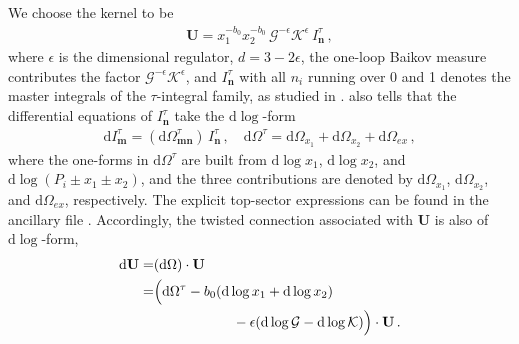 \documentclass[%
 reprint,
 amsmath,amssymb,
 aps,
prd,
]{revtex4-2}
\def\ie{\begin{equation}\begin{aligned}}
\def\fe{\end{aligned}\end{equation}}
\def\di{{\mathrm{d}}}
\def\ii{\mathrm{i}}
\def\ep{\epsilon}
\newcommand{\mG}{\mathcal{G}}
\newcommand{\mK}{\mathcal{K}}
\newcommand{\zq}[1]{{\color[rgb]{.1,.6,.3}{[{ZQ:} #1]}}}
\newcommand{\cjq}[1]{{\color[rgb]{.1,.6,.3}{[{CJQ:} #1]}}}
\begin{document}
We choose the kernel to be
\begin{align}
	\mathbf{U} = x_1^{-b_0}x_2^{-b_0}\,\mG^{-\ep}\mK^{\ep}\,I^{\tau}_{\bm n}\,,
\end{align}
where \(\ep\) is the dimensional regulator, \(d=3-2\ep\), the one-loop Baikov measure contributes the factor \(\mG^{-\ep}\mK^{\ep}\), and \(I^{\tau}_{\bm n}\) with all $n_i$  running over 0 and 1 denotes the master integrals of the \(\tau\)-integral family, as studied in \cite{Chen:2023iix}. 
\cite{Chen:2023iix} also tells that the differential equations of $I^{\tau}_{\bm n}$ take the \(\di\log\)-form 
\begin{align}
	\di I^{\tau}_{\bm m}=(\di\Omega_{\bm m\bm n}^{\tau})\,I^{\tau}_{\bm n} \,, \quad \di\Omega^{\tau}=\di\Omega_{x_1}+\di\Omega_{x_2}+\di\Omega_{ex}\,,  \label{eq:Omegatau}
\end{align}
where the one-forms in \(\di\Omega^{\tau}\) are built from \(\di\log x_1\), \(\di\log x_2\), and \(\di\log(P_i\pm x_1\pm x_2)\), and the three contributions are denoted by \(\di\Omega_{x_1}\), \(\di\Omega_{x_2}\), and \(\di\Omega_{ex}\), respectively. The explicit top-sector expressions can be found in the ancillary file \zq{file}.
Accordingly, the twisted connection associated with \(\mathbf{U}\) is also of \(\di\log\)-form,
\begin{align}
	\di \mathbf{U}=&(\di \Omega)\cdot \mathbf{U}\notag\\
 =&\Big(\di\Omega^{\tau}-b_0(\di\log x_1+\di\log x_2)\notag\\
 &~~~~~~~~~~~~~~~~~-\ep(\di\log \mG-\di\log \mK)\Big)\cdot \mathbf{U} \,.
\end{align}
\end{document}
